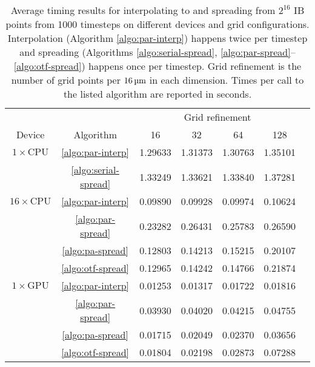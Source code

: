 \begin{table}[ht]
    \begin{center}
    \bgroup
    \renewcommand{\arraystretch}{1.7}
    \begin{tabular}{ccccccc}
                                                                                              \toprule
                             &                          & \multicolumn{4}{c}{Grid refinement}   \\ \cline{3-6}
        Device               & Algorithm                & 16      & 32      & 64      & 128     \\ \midrule
        $1\times\text{CPU}$  & \ref{algo:par-interp}    & 1.29633 & 1.31373 & 1.30763 & 1.35101 \\
                             & \ref{algo:serial-spread} & 1.33249 & 1.33621 & 1.33840 & 1.37281 \\ \midrule
        $16\times\text{CPU}$ & \ref{algo:par-interp}    & 0.09890 & 0.09928 & 0.09974 & 0.10624 \\
                             & \ref{algo:par-spread}    & 0.23282 & 0.26431 & 0.25783 & 0.26590 \\
                             & \ref{algo:pa-spread}     & 0.12803 & 0.14213 & 0.15215 & 0.20107 \\
                             & \ref{algo:otf-spread}    & 0.12965 & 0.14242 & 0.14766 & 0.21874 \\ \midrule
        $1\times\text{GPU}$  & \ref{algo:par-interp}    & 0.01253 & 0.01317 & 0.01722 & 0.01816 \\
                             & \ref{algo:par-spread}    & 0.03930 & 0.04020 & 0.04215 & 0.04755 \\
                             & \ref{algo:pa-spread}     & 0.01715 & 0.02049 & 0.02370 & 0.03656 \\
                             & \ref{algo:otf-spread}    & 0.01804 & 0.02198 & 0.02873 & 0.07288 \\ \bottomrule
    \end{tabular}
    \egroup
    \end{center}
    \caption{%
Average timing results for interpolating to and spreading from $2^{16}$ IB points from
1000 timesteps on different devices and grid configurations. Interpolation (Algorithm
\ref{algo:par-interp}) happens twice per timestep and spreading (Algorithms
\ref{algo:serial-spread}, \ref{algo:par-spread}--\ref{algo:otf-spread}) happens once per
timestep. Grid refinement is the number of grid points per $16\um$ in each dimension.
Times per call to the listed algorithm are reported in seconds.
    }
    \label{tab:grid-timing}
\end{table}

